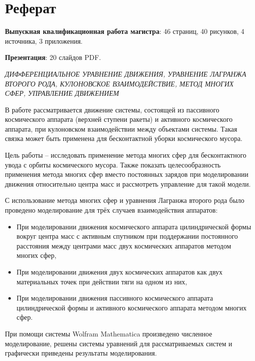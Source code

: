 \section*{Реферат}
\textbf{Выпускная квалификационная работа магистра}: 46 страниц, 40 рисунков, 4 источника, 3 приложения. 

\textbf{Презентация}: 20 слайдов PDF.

\hspace{1pt}

\textit{ДИФФЕРЕНЦИАЛЬНОЕ УРАВНЕНИЕ ДВИЖЕНИЯ, УРАВНЕНИЕ ЛАГРАНЖА ВТОРОГО РОДА, КУЛОНОВСКОЕ ВЗАИМОДЕЙСТВИЕ, МЕТОД МНОГИХ СФЕР, УПРАВЛЕНИЕ ДВИЖЕНИЕМ}

\hspace{1pt}

В работе рассматривается движение системы, состоящей из пассивного космического аппарата (верхней ступени ракеты) и активного космического аппарата, при кулоновском взаимодействии между объектами системы.
Такая связка может быть применена для бесконтактной уборки космического мусора.

Цель работы – исследовать применение метода многих сфер  для бесконтактного увода с орбиты космического мусора.
Также показать целесообразность применения метода многих сфер вместо постоянных зарядов при моделировании движения относительно центра масс и рассмотреть управление для такой модели.

С использование метода многих сфер и уравнения Лагранжа второго рода было проведено моделирование для трёх случаев взаимодействия аппаратов:
\begin{itemize}
	\item При моделировании движения космического аппарата цилиндрической формы вокруг центра масс с активным спутником при поддержании постоянного расстояния между центрами масс двух космических аппаратов методом многих сфер,
	\item При моделировании движения двух космических аппаратов как двух материальных точек при действии тяги на одном из них,
	\item При моделировании движения пассивного космического аппарата цилиндрической формы и активного космического аппарата методом многих сфер.
\end{itemize}
При помощи системы Wolfram Mathematica произведено численное моделирование, решены системы уравнений для рассматриваемых систем и графически приведены результаты моделирования.